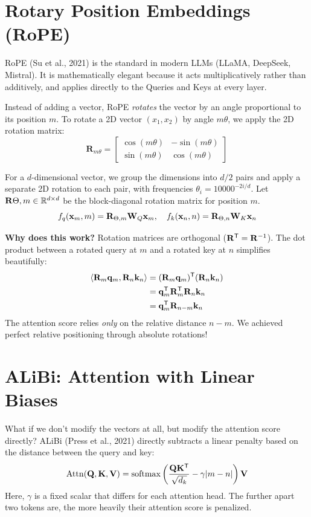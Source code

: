 \section{Rotary Position Embeddings (RoPE)}

RoPE (Su et al., 2021) is the standard in modern LLMs (LLaMA, DeepSeek, Mistral). It is mathematically elegant because it acts multiplicatively rather than additively, and applies directly to the Queries and Keys at every layer.

Instead of adding a vector, RoPE \emph{rotates} the vector by an angle proportional to its position $m$. 
To rotate a 2D vector $(x_1, x_2)$ by angle $m\theta$, we apply the 2D rotation matrix:
\begin{equation}
\mathbf{R}_{m\theta} = \begin{bmatrix} 
\cos(m\theta) & -\sin(m\theta) \\ 
\sin(m\theta) & \cos(m\theta) 
\end{bmatrix}
\end{equation}

For a $d$-dimensional vector, we group the dimensions into $d/2$ pairs and apply a separate 2D rotation to each pair, with frequencies $\theta_i = 10000^{-2i/d}$.
Let $\mathbf{R} \Theta, m \in \mathbb{R}^{d \times d}$ be the block-diagonal rotation matrix for position $m$. 
\begin{equation}
f_q(\mathbf{x}_m, m) = \mathbf{R}_{\Theta, m} \mathbf{W}_Q \mathbf{x}_m, \quad f_k(\mathbf{x}_n, n) = \mathbf{R}_{\Theta, n} \mathbf{W}_K \mathbf{x}_n
\end{equation}

\textbf{Why does this work?} Rotation matrices are orthogonal ($\mathbf{R}^{\mathsf{T}} = \mathbf{R}^{-1}$). The dot product between a rotated query at $m$ and a rotated key at $n$ simplifies beautifully:
\begin{align}
\langle \mathbf{R}_m \mathbf{q}_m, \mathbf{R}_n \mathbf{k}_n \rangle &= (\mathbf{R}_m \mathbf{q}_m)^{\mathsf{T}} (\mathbf{R}_n \mathbf{k}_n) \\
&= \mathbf{q}_m^{\mathsf{T}} \mathbf{R}_m^{\mathsf{T}} \mathbf{R}_n \mathbf{k}_n \\
&= \mathbf{q}_m^{\mathsf{T}} \mathbf{R}_{n-m} \mathbf{k}_n
\end{align}
The attention score relies \emph{only} on the relative distance $n-m$. We achieved perfect relative positioning through absolute rotations!

\section{ALiBi: Attention with Linear Biases}

What if we don't modify the vectors at all, but modify the attention score directly?
ALiBi (Press et al., 2021) directly subtracts a linear penalty based on the distance between the query and key:
\begin{equation}
\operatorname{Attn}(\mathbf{Q}, \mathbf{K}, \mathbf{V}) = \operatorname{softmax}\left(\frac{\mathbf{Q} \mathbf{K}^{\mathsf{T}}}{\sqrt{d_k}} - \gamma |m-n| \right) \mathbf{V}
\end{equation}
Here, $\gamma$ is a fixed scalar that differs for each attention head. The further apart two tokens are, the more heavily their attention score is penalized.


